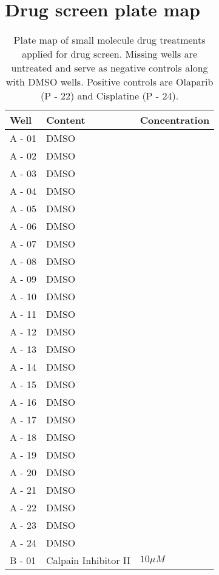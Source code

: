 
\chapter{Drug screen plate map} %

\label{AppendixC} %


\begin{center}
\begin{longtable}{|p{}|p{}|p{}|}
\caption{Plate map of small molecule drug treatments applied for drug screen. Missing wells are untreated and serve as negative controls along with DMSO wells. Positive controls are Olaparib (P - 22) and Cisplatine (P - 24).} \\
\hline
Well & Content & Concentration \\
\hline
A - 01 & DMSO & \\
A - 02 & DMSO & \\
A - 03 & DMSO & \\
A - 04 & DMSO & \\
A - 05 & DMSO & \\
A - 06 & DMSO & \\
A - 07 & DMSO & \\
A - 08 & DMSO & \\
A - 09 & DMSO & \\
A - 10 & DMSO & \\
A - 11 & DMSO & \\
A - 12 & DMSO & \\
A - 13 & DMSO & \\
A - 14 & DMSO & \\
A - 15 & DMSO & \\
A - 16 & DMSO & \\
A - 17 & DMSO & \\
A - 18 & DMSO & \\
A - 19 & DMSO & \\
A - 20 & DMSO & \\
A - 21 & DMSO & \\
A - 22 & DMSO & \\
A - 23 & DMSO & \\
A - 24 & DMSO & \\
B - 01 & Calpain Inhibitor II	& $10\mu M$ \\

\end{longtable}
\end{center}
